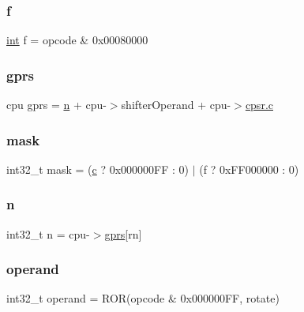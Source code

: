 \subsubsection{\texorpdfstring{f}{f}}
{\footnotesize\ttfamily \mbox{\hyperlink{ioapi_8h_a787fa3cf048117ba7123753c1e74fcd6}{int}} f = opcode \& 0x00080000}

\mbox{\label{isa-arm_8c_a846d9bd9cdde9b5b8a4ca76a4f6f50bc}} 
\subsubsection{\texorpdfstring{gprs}{gprs}}
{\footnotesize\ttfamily cpu gprs = \mbox{\hyperlink{isa-lr35902_8c_ae54e54065504090672c92ef62a1c5f05}{n}} + cpu-\/$>$shifter\+Operand + cpu-\/$>$\mbox{\hyperlink{isa-lr35902_8c_ab27f9f98dd173bfc694f5d161e839d6e}{cpsr.\+c}}}

\mbox{\label{isa-arm_8c_a9fa3ab2bb634e0dde316d74d14fa564f}} 
\subsubsection{\texorpdfstring{mask}{mask}}
{\footnotesize\ttfamily int32\+\_\+t mask = (\mbox{\hyperlink{isa-lr35902_8c_ab27f9f98dd173bfc694f5d161e839d6e}{c}} ? 0x000000\+F\+F \+: 0) $\vert$ (f ? 0x\+F\+F000000 \+: 0)}

\mbox{\label{isa-arm_8c_a4e34aefb3cc5403a07c020131077100a}} 
\subsubsection{\texorpdfstring{n}{n}}
{\footnotesize\ttfamily int32\+\_\+t n = cpu-\/$>$\mbox{\hyperlink{isa-thumb_8c_a6b4b7e13a9a144391615b217c5917bc7}{gprs}}\mbox{[}rn\mbox{]}}

\mbox{\label{isa-arm_8c_ab96c60b54bef12d0edc21e03c79be1ac}} 
\subsubsection{\texorpdfstring{operand}{operand}}
{\footnotesize\ttfamily int32\+\_\+t operand = R\+OR(opcode \& 0x000000\+F\+F, rotate)}

